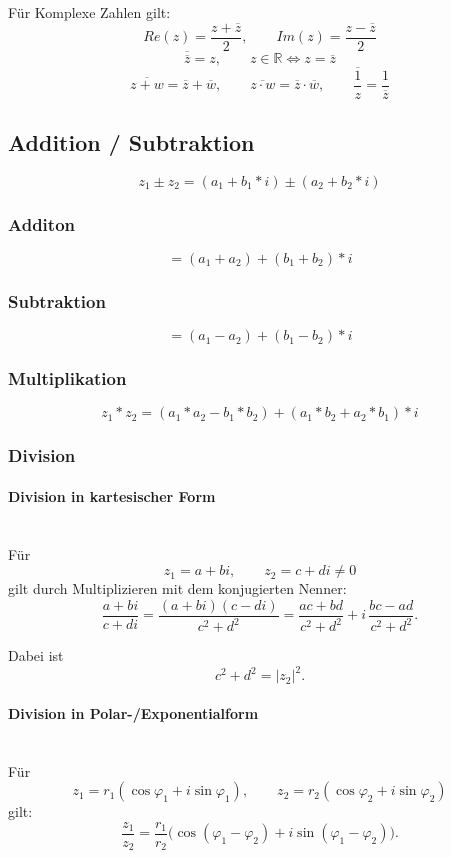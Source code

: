 \documentclass[10pt,a4paper,twocolumn]{article}
\begin{document}
	Für Komplexe Zahlen gilt:
	$$Re(z)=\frac{z+\overline{z}}{2}, \qquad Im(z)=\frac{z-\overline{z}}{2}$$
	$$\overline{\overline{z}}=z, \qquad z\in\mathbb{R} \iff z=\overline{z}$$
	$$\overline{z+w}=\overline{z}+\overline{w}, \qquad \overline{z\cdot w}=\overline{z}\cdot\overline{w}, \qquad \overline{\frac{1}{z}}=\frac{1}{\overline{z}}$$
	
	\subsection{Addition / Subtraktion}
	$$z_1\pm z_2=(a_1+b_1*i)\pm(a_2+b_2*i)$$
	\subsubsection{Additon}
	$$=(a_1+a_2)+(b_1+b_2)*i$$
	\subsubsection{Subtraktion}
	$$=(a_1-a_2)+(b_1-b_2)*i$$
	
	\subsubsection{Multiplikation}
	$$z_1*z_2=(a_1*a_2-b_1*b_2)+(a_1*b_2+a_2*b_1)*i$$
	
	\subsubsection{Division}
	\paragraph{Division in kartesischer Form}\mbox{}\\
	
	Für \[
	z_1 = a+bi,\qquad z_2 = c+di \neq 0
	\]
	gilt durch Multiplizieren mit dem konjugierten Nenner:
	\[
	\frac{a+bi}{c+di}
	=
	\frac{(a+bi)(c-di)}{c^2+d^2}
	=
	\frac{ac+bd}{c^2+d^2}
	+
	i\,\frac{bc-ad}{c^2+d^2}.
	\]
	
	Dabei ist
	\[
	c^2+d^2 = |z_2|^2.
	\]
	
	\paragraph{Division in Polar-/Exponentialform}\mbox{}\\
	
	Für
	\[
	z_1 = r_1(\cos\varphi_1+i\sin\varphi_1), \qquad
	z_2 = r_2(\cos\varphi_2+i\sin\varphi_2)
	\]
	gilt:
	\[
	\frac{z_1}{z_2}
	=
	\frac{r_1}{r_2}
	\Big(\cos(\varphi_1-\varphi_2)+i\sin(\varphi_1-\varphi_2)\Big).
	\]
	
\end{document}
